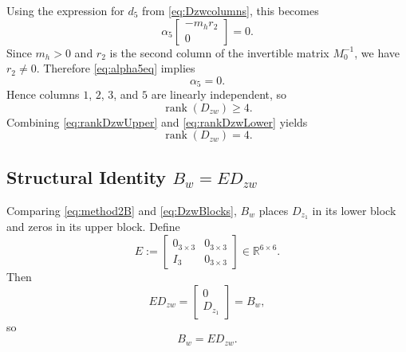 \documentclass[11pt]{article}
\newcommand{\R}{\mathbb{R}}
\newcommand{\rank}{\operatorname{rank}}
\begin{document}
Using the expression for $d_5$ from \eqref{eq:Dzwcolumns}, this becomes
\begin{equation}
    \alpha_5
    \begin{bmatrix}
        -m_h r_2 \\ 0
    \end{bmatrix}
    = 0.
    \label{eq:alpha5eq} 
\end{equation}
Since $m_h > 0$ and $r_2$ is the second column of the invertible matrix $M_0^{-1}$, we have $r_2 \neq 0$. Therefore \eqref{eq:alpha5eq} implies
\begin{equation}
    \alpha_5 = 0.
\end{equation}
Hence columns $1$, $2$, $3$, and $5$ are linearly independent, so
\begin{equation}
    \rank(D_{zw}) \geq 4.
    \label{eq:rankDzwLower}
\end{equation}
Combining \eqref{eq:rankDzwUpper} and \eqref{eq:rankDzwLower} yields
\begin{equation}
    \rank(D_{zw}) = 4.
    \label{eq:rankDzw}
\end{equation}





\subsection{Structural Identity $B_w = E D_{zw}$}
Comparing \eqref{eq:method2B} and \eqref{eq:DzwBlocks}, $B_w$ places $D_{z_1}$ in its lower block and zeros in its upper block. Define
\begin{equation}
    E :=
    \begin{bmatrix}
        0_{3\times 3} & 0_{3\times 3} \\
        I_3 & 0_{3\times 3}
    \end{bmatrix}
    \in \R^{6\times 6}.
    \label{eq:Edef}
\end{equation}
Then
\begin{equation}
    E D_{zw}
    =
    \begin{bmatrix}
        0 \\
        D_{z_1}
    \end{bmatrix}
    =
    B_w,
    \label{eq:BwEDzw}
\end{equation}
so
\begin{equation}
    B_w = E D_{zw}.
\end{equation}
\end{document}
